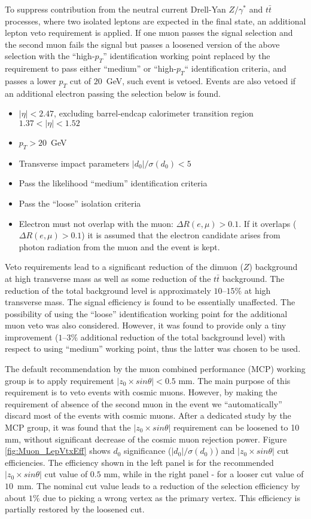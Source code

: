To suppress contribution from the neutral current Drell-Yan $Z/\gamma^*$ and $t\bar{t}$ processes,
where two isolated leptons are expected in the final state, an additional lepton veto requirement
is applied. If one muon passes the signal selection and the second muon fails the signal but passes a loosened version of the above selection with the ``high-$p_T$'' identification working point replaced by the requirement to pass either ``medium'' or
``high-$p_T$`` identification criteria, and passes a lower $p_T$ cut of $20$~GeV, such event is vetoed.
Events are also vetoed if an additional electron passing the selection below is found.
\begin{itemize}
\item $|\eta| < 2.47$, excluding barrel-endcap calorimeter transition region $1.37 < |\eta| < 1.52$
\item $p_T > 20$~GeV
\item Transverse impact parameters $|d_0|/\sigma(d_0) < 5$
\item Pass the likelihood ``medium'' identification criteria~\cite{ATL-PHYS-PUB-2015-041}
\item Pass the ``loose'' isolation criteria~\cite{ATLAS-CONF-2016-024}
\item Electron must not overlap with the muon: $\Delta R(e,\mu)>0.1$. If it overlaps ($\Delta R(e,\mu)>0.1$)
it is assumed that the electron candidate arises from photon radiation from the muon and the event is kept.
\end{itemize}
Veto requirements lead to a significant reduction of the dimuon ($Z$) background
at high transverse mass as well as some reduction of the $t\bar{t}$ background.
The reduction of the total background level is approximately $10$--$15\%$ at high transverse mass. 
The signal efficiency is found to be essentially unaffected.
The possibility of using the ``loose'' identification working point for the additional muon veto was also considered. However, it was found to provide only a tiny improvement ($1$--$3\%$ additional reduction of the total background level) with respect to using ``medium'' working point, thus the latter was chosen to be used.

The default recommendation by the muon combined performance (MCP) working group is to apply requirement $|z_0 \times sin \theta| < 0.5$ mm. The main purpose of this requirement is to veto events with cosmic muons.
However, by making the requirement of absence of the second muon in the event we ``automatically'' discard most of the events with cosmic muons. After a dedicated study by the MCP group, it was found that the 
$|z_0 \times sin \theta|$ requirement can be loosened to 10 mm, without significant decrease of the cosmic muon rejection power.
Figure \ref{fig:Muon_LepVtxEff} shows $d_0$ significance ($|d_0|/\sigma(d_0)$) and $|z_0 \times sin \theta|$ cut efficiencies. The efficiency shown in the left panel is for the recommended $|z_0 \times sin \theta|$ cut value of $0.5$ mm, while in the right panel - for a looser
cut value of $10$~mm. The nominal cut value leads to a reduction of the selection efficiency by about $1$\% due to picking a wrong vertex as the primary vertex. This efficiency is partially restored by the loosened cut.

